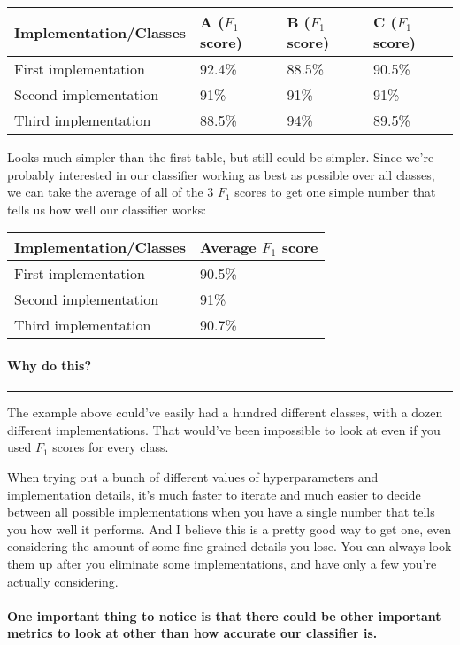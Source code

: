 \documentclass[
]{article}
\begin{document}
\begin{longtable}[]{@{}llll@{}}
\toprule
Implementation/Classes & A (\(F_1\) score) & B (\(F_1\) score) & C
(\(F_1\) score)\tabularnewline
\midrule
\endhead
First implementation & 92.4\% & 88.5\% & 90.5\%\tabularnewline
Second implementation & 91\% & 91\% & 91\%\tabularnewline
Third implementation & 88.5\% & 94\% & 89.5\%\tabularnewline
\bottomrule
\end{longtable}

Looks much simpler than the first table, but still could be simpler.
Since we're probably interested in our classifier working as best as
possible over all classes, we can take the average of all of the 3
\(F_1\) scores to get one simple number that tells us how well our
classifier works:

\begin{longtable}[]{@{}ll@{}}
\toprule
Implementation/Classes & Average \(F_1\) score\tabularnewline
\midrule
\endhead
First implementation & 90.5\%\tabularnewline
Second implementation & 91\%\tabularnewline
Third implementation & 90.7\%\tabularnewline
\bottomrule
\end{longtable}

\hypertarget{header-n226}{%
\paragraph{\texorpdfstring{\textbf{Why do
this?}}{Why do this?}}\label{header-n226}}

\begin{center}\rule{0.5\linewidth}{0.5pt}\end{center}

The example above could've easily had a hundred different classes, with
a dozen different implementations. That would've been impossible to look
at even if you used \(F_1\) scores for every class.

When trying out a bunch of different values of hyperparameters and
implementation details, it's much faster to iterate and much easier to
decide between all possible implementations when you have a single
number that tells you how well it performs. And I believe this is a
pretty good way to get one, even considering the amount of some
fine-grained details you lose. You can always look them up after you
eliminate some implementations, and have only a few you're actually
considering.

\hypertarget{header-n230}{%
\paragraph{\texorpdfstring{One important thing to notice is that
\textbf{there could be other important metrics to look at} other than
how accurate our classifier
is.}{One important thing to notice is that there could be other important metrics to look at other than how accurate our classifier is.}}\label{header-n230}}
\end{document}
